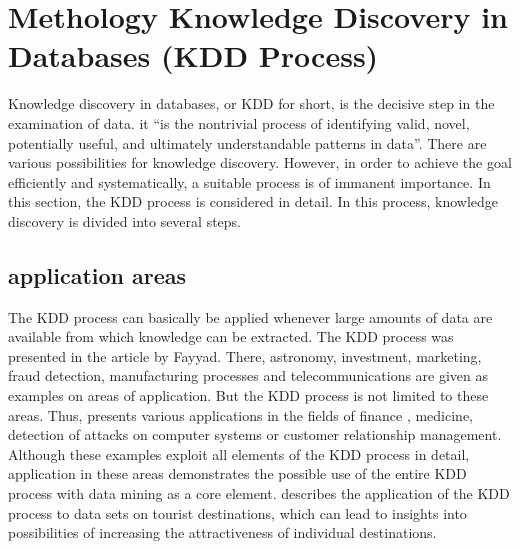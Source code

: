 %
%


%
%



\chapter{Methology Knowledge Discovery in Databases (KDD Process)}
\label{KDD}
Knowledge discovery in databases, or KDD for short, is the decisive step in the examination of data. it “is the nontrivial process of identifying valid, novel, potentially useful, and ultimately understandable patterns in data”.\cite{Fayyad:1996}
There are various possibilities for knowledge discovery. However, in order to achieve the goal efficiently and systematically, a suitable process is of immanent importance. In this section, the KDD process is considered in detail. In this process, knowledge discovery is divided into several steps.  \cite{Dusing.2000}

\section{application areas}
The KDD process can basically be applied whenever large amounts of data are available from which knowledge can be extracted. The KDD process was presented in the article by Fayyad. \cite{Fayyad:1996}  There, astronomy, investment, marketing, fraud detection, manufacturing processes and telecommunications are given as examples on areas of application. But the KDD process is not limited to these areas. Thus, \cite{Maimon:2010} presents various applications in the fields of finance , medicine, detection of attacks on computer systems or customer relationship management. Although these examples exploit all elements of the KDD process in detail, application in these areas demonstrates the possible use of the entire KDD process with data mining as a core element. \cite{Pyo:2002} describes the application of the KDD process to data sets on tourist destinations, which can lead to insights into possibilities of increasing the attractiveness of individual destinations.

